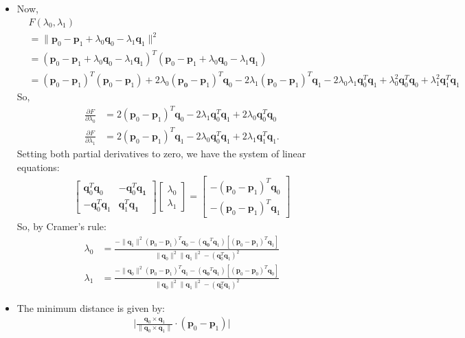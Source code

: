 \documentclass[10pt]{article}
\newcommand{\ve}[1]{\mathbf{#1}}
\begin{document}
\begin{itemize}
    \item Now,
    \begin{align*}
      & F(\lambda_0, \lambda_1)\\
      &= \| \ve{p}_0 - \ve{p}_1 + \lambda_0 \ve{q}_0 - \lambda_1 \ve{q}_1 \|^2\\
      &= (\ve{p}_0 - \ve{p}_1 + \lambda_0 \ve{q}_0 - \lambda_1 \ve{q}_1)^T(\ve{p}_0 - \ve{p}_1 + \lambda_0 \ve{q}_0 - \lambda_1 \ve{q}_1)\\
      &= (\ve{p}_0 - \ve{p}_1)^T(\ve{p}_0 - \ve{p}_1) + 2\lambda_0 (\ve{p_0} -\ve{p}_1)^T \ve{q}_0 - 2 \lambda_1 (\ve{p}_0 - \ve{p}_1)^T \ve{q}_1 - 2\lambda_0 \lambda_1 \ve{q}_0^T\ve{q}_1 + \lambda_0^2 \ve{q}_0^T \ve{q}_0 + \lambda_1^2 \ve{q}_1^T \ve{q}_1
    \end{align*}
    So,
    \begin{align*}
      \frac{\partial F}{\partial \lambda_0} &= 2(\ve{p}_0 - \ve{p}_1)^T \ve{q}_0 - 2 \lambda_1 \ve{q}_0^T \ve{q}_1 + 2\lambda_0 \ve{q}_0^T \ve{q}_0\\
      \frac{\partial F}{\partial \lambda_1} &= 2(\ve{p}_0 - \ve{p}_1)^T \ve{q}_1 - 2 \lambda_0 \ve{q}_0^T \ve{q}_1 + 2\lambda_1 \ve{q}_1^T \ve{q}_1.
    \end{align*}
    Setting both partial derivatives to zero, we have the system of linear equations:
    \begin{align*}
      \begin{bmatrix}
        \ve{q}_0^T \ve{q}_0 & - \ve{q}_0^T \ve{q_1}\\
        -\ve{q}_0^T \ve{q}_1 &  \ve{q}_1^T \ve{q_1}
      \end{bmatrix}
      \begin{bmatrix}
        \lambda_0\\
        \lambda_1
      \end{bmatrix}
      =
      \begin{bmatrix}
        -(\ve{p}_0 - \ve{p}_1)^T \ve{q}_0\\
        -(\ve{p}_0 - \ve{p}_1)^T \ve{q}_1
      \end{bmatrix}
    \end{align*}
    So, by Cramer's rule:
    \begin{align*}
      \lambda_0 &= \frac{-\|\ve{q}_1\|^2 (\ve{p}_0 - \ve{p}_1)^T \ve{q}_0 - (\ve{q_0}^T \ve{q}_1)[(\ve{p}_0 - \ve{p}_1)^T \ve{q}_1]}{\| \ve{q}_0\|^2 \| \ve{q}_1 \|^2 - (\ve{q}_0^T \ve{q}_1)^2}\\
      \lambda_1 &= \frac{-\|\ve{q}_0\|^2 (\ve{p}_0 - \ve{p}_1)^T \ve{q}_1 - (\ve{q_0}^T \ve{q}_1)[(\ve{p}_0 - \ve{p}_0)^T \ve{q}_0]}{\| \ve{q}_0\|^2 \| \ve{q}_1 \|^2 - (\ve{q}_0^T \ve{q}_1)^2}
    \end{align*}

    \item The minimum distance is given by:
    \begin{align*}
      \bigg| \frac{\ve{q}_0 \times \ve{q}_1 }{\| \ve{q}_0 \times \ve{q}_1 \|} \cdot (\ve{p}_0 - \ve{p}_1) \bigg|
    \end{align*}
  \end{itemize}
  
\end{document}
